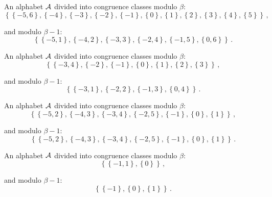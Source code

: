 


\begin{exmp}
\label{ex:integerAB}

An alphabet $\mathcal{A}$ divided into congruence classes modulo $\beta$: 
$$ \left\{\left\{-5, 6\right\}, \left\{-4\right\}, \left\{-3\right\}, \left\{-2\right\}, \left\{-1\right\}, \left\{0\right\}, \left\{1\right\}, \left\{2\right\}, \left\{3\right\}, \left\{4\right\}, \left\{5\right\}\right\} \,,$$

and modulo $\beta - 1$: $$ \left\{\left\{-5, 1\right\}, \left\{-4, 2\right\}, \left\{-3, 3\right\}, \left\{-2, 4\right\}, \left\{-1, 5\right\}, \left\{0, 6\right\}\right\} \,.$$

\end{exmp}





\begin{exmp}
\label{ex:integerAD}

An alphabet $\mathcal{A}$ divided into congruence classes modulo $\beta$: 
$$ \left\{\left\{-3, 4\right\}, \left\{-2\right\}, \left\{-1\right\}, \left\{0\right\}, \left\{1\right\}, \left\{2\right\}, \left\{3\right\}\right\} \,,$$

and modulo $\beta - 1$: $$ \left\{\left\{-3, 1\right\}, \left\{-2, 2\right\}, \left\{-1, 3\right\}, \left\{0, 4\right\}\right\} \,.$$

\end{exmp}


\begin{exmp}
\label{ex:integerAE}

An alphabet $\mathcal{A}$ divided into congruence classes modulo $\beta$: 
$$ \left\{\left\{-5, 2\right\}, \left\{-4, 3\right\}, \left\{-3, 4\right\}, \left\{-2, 5\right\}, \left\{-1\right\}, \left\{0\right\}, \left\{1\right\}\right\} \,,$$

and modulo $\beta - 1$: $$ \left\{\left\{-5, 2\right\}, \left\{-4, 3\right\}, \left\{-3, 4\right\}, \left\{-2, 5\right\}, \left\{-1\right\}, \left\{0\right\}, \left\{1\right\}\right\} \,.$$

\end{exmp}




\begin{exmp}
\label{ex:integerAG}

An alphabet $\mathcal{A}$ divided into congruence classes modulo $\beta$: 
$$ \left\{\left\{-1, 1\right\}, \left\{0\right\}\right\} \,,$$

and modulo $\beta - 1$: $$ \left\{\left\{-1\right\}, \left\{0\right\}, \left\{1\right\}\right\} \,.$$

\end{exmp}


